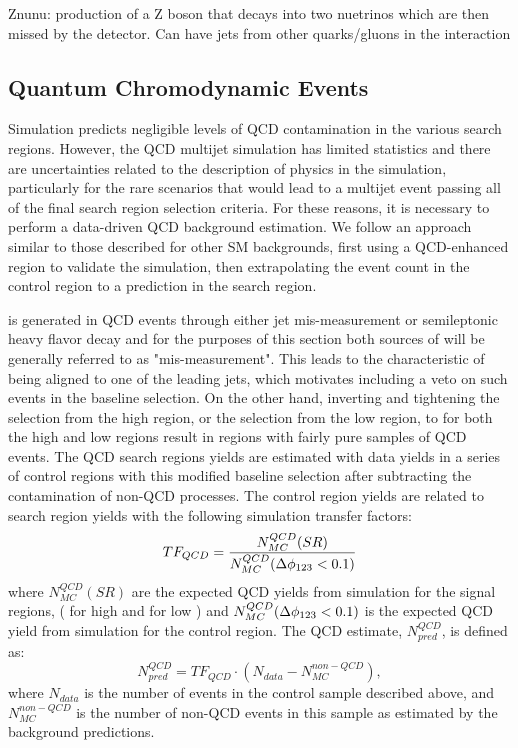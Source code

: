 Znunu: production of a Z boson that decays into two nuetrinos which are then missed by the detector. Can have jets from other quarks/gluons in the interaction

\subsection{Quantum Chromodynamic Events}
\label{subsec:QCD}

Simulation predicts negligible levels of QCD contamination in the various search regions. However, the QCD multijet simulation has limited statistics and there are uncertainties related to the description of physics in the simulation, particularly for the rare scenarios that would lead to a multijet event passing all of the final search region selection criteria. For these reasons, it is necessary to perform a data-driven QCD background estimation. We follow an approach similar to those described for other SM backgrounds, first using a QCD-enhanced region to validate the simulation, then extrapolating the event count in the control region to a prediction in the search region. 

\met{} is generated in QCD events through either jet \pt{} mis-measurement or semileptonic heavy flavor decay and for the purposes of this section both sources of \met{} will be generally referred to as "mis-measurement". This leads to the characteristic of \met{} being aligned to one of the leading jets, which motivates including a veto on such events in the baseline selection. On the other hand, inverting and tightening the \qcdhighdm{} selection from the high \dm{} region, or the \qcdlowdm{} selection from the low \dm{} region, to \qcdcr{} for both the high and low \dm{} regions result in regions with fairly pure samples of QCD events. The QCD search regions yields are estimated with data yields in a series of control regions with this modified baseline selection after subtracting the contamination of non-QCD processes. The control region yields are related to search region yields with the following simulation transfer factors:
\begin{equation}\label{QCDTF}
TF_{QCD}=\frac{N_{MC}^{QCD}(SR)}{N_{MC}^{QCD}(\Delta\phi_{123}<0.1)}
\end{equation}
where $N_{MC}^{QCD}(SR)$ are the expected QCD yields from simulation for the signal regions, (\qcdhighdm{} for high \dm{} and \qcdlowdm{} for low \dm) and $N_{MC}^{QCD}(\Delta\phi_{123}<0.1)$ is the expected QCD yield from simulation for the control region. The QCD estimate, $N_{pred}^{QCD}$, is defined as:
\begin{equation}
N_{pred}^{QCD}=TF_{QCD}\cdot(N_{data}-N_{MC}^{non-QCD}),
\end{equation}
where $N_{data}$ is the number of events in the \qcdcr{} control sample described above, and $N_{MC}^{non-QCD}$ is the number of non-QCD events in this sample as estimated by the background predictions.

